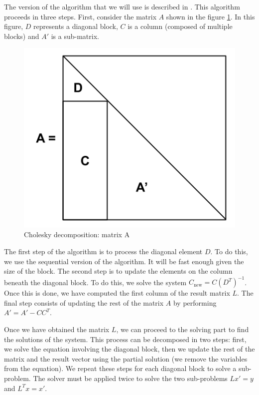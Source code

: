 The version of the algorithm that we will use is described in
\cite{choleskyblock}. This algorithm proceeds in three steps. First, consider
the matrix $A$ shown in the figure \ref{fig:chodeca}. In this figure, $D$
represents a diagonal block, $C$ is a column (composed of multiple blocks) and
$A'$ is a sub-matrix.

\begin{figure}[!ht]
  \begin{center}
    \includegraphics[scale=0.4]{img/cho-img/cho_block_dec_A.png}
    \caption{Cholesky decomposition: matrix A}
    \label{fig:chodeca}
  \end{center}
\end{figure}

The first step of the algorithm is to process the diagonal element $D$. To do
this, we use the sequential version of the algorithm. It will be fast enough
given the size of the block. The second step is to update the elements on the
column beneath the diagonal block. To do this, we solve the system
$C_{\text{new}} = C(D^{T})^{-1}$. Once this is done, we have computed the first
column of the result matrix $L$. The final step consists of updating the rest of
the matrix $A$ by performing $A' = A' - CC^{T}$.

Once we have obtained the matrix $L$, we can proceed to the solving part to find
the solutions of the system. This process can be decomposed in two steps: first,
we solve the equation involving the diagonal block, then we update the rest of
the matrix and the result vector using the partial solution (we remove the
variables from the equation). We repeat these steps for each diagonal block to
solve a sub-problem. The solver must be applied twice to solve the two
sub-problems $Lx' = y$ and $L^{T}x = x'$.

